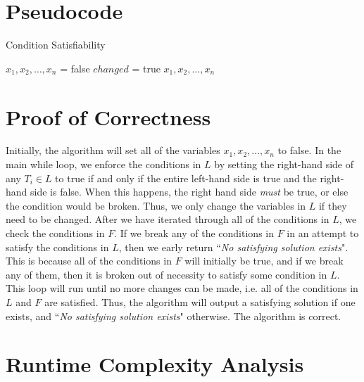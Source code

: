 \documentclass{article}
\begin{document}
\section{Pseudocode}

\begin{algorithm}[H]
\caption{Condition Satisfiability}
\BlankLine
$x_1, x_2, \ldots, x_n$ = false\;
$changed$ = true\;
\BlankLine
{}
\BlankLine
\Return $x_1, x_2, \ldots, x_n$\;
\end{algorithm}

\section{Proof of Correctness}

Initially, the algorithm will set all of the variables $x_1, x_2, \ldots, x_n$ to false.
In the main while loop, we enforce the conditions in $L$ by setting the right-hand side of any $T_i \in L$ to true if and only if the entire left-hand side is true and the right-hand side is false.
When this happens, the right hand side \textit{must} be true, or else the condition would be broken.
Thus, we only change the variables in $L$ if they need to be changed.
After we have iterated through all of the conditions in $L$, we check the conditions in $F$.
If we break any of the conditions in $F$ in an attempt to satisfy the conditions in $L$, then we early return ``\textit{No satisfying solution exists}".
This is because all of the conditions in $F$ will initially be true, and if we break any of them, then it is broken out of necessity to satisfy some condition in $L$.
This loop will run until no more changes can be made, i.e. all of the conditions in $L$ and $F$ are satisfied.
Thus, the algorithm will output a satisfying solution if one exists, and ``\textit{No satisfying solution exists}" otherwise.
The algorithm is correct.

\section{Runtime Complexity Analysis}
\end{document}
